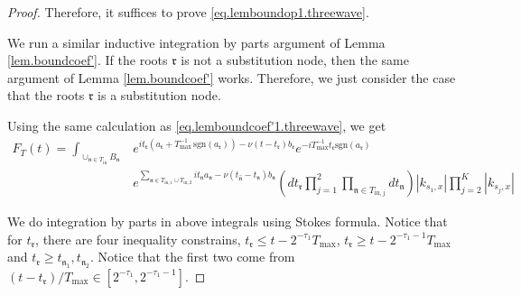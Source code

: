 \begin{proof}
Therefore, it suffices to prove \eqref{eq.lemboundop1.threewave}.

We run a similar inductive integration by parts argument of Lemma \ref{lem.boundcoef'}. If the roots $\mathfrak{r}$ is not a substitution node, then the same argument of Lemma \ref{lem.boundcoef'} works. Therefore, we just consider the case that the roots $\mathfrak{r}$ is a substitution node. 

Using the same calculation as \eqref{eq.lemboundcoef'1.threewave}, we get 
\begin{equation}
\begin{split}
    F_{T}(t)=\int_{\cup_{\mathfrak{n}\in T_{\text{in}}} B_{\mathfrak{n}}}&e^{it_{\mathfrak{r}}(a_{\mathfrak{r}}+T^{-1}_{\text{max}}\, \text{sgn}(a_{\mathfrak{r}}))- \nu(t-t_{\mathfrak{r}})b_{\mathfrak{r}}} e^{-iT^{-1}_{\text{max}}t_{\mathfrak{r}} \text{sgn}(a_{\mathfrak{r}})} 
    \\
    &e^{\sum_{\mathfrak{n}\in T_{\text{in},1}\cup T_{\text{in},2}} it_{\mathfrak{n}} a_{\mathfrak{n}} - \nu(t_{\widehat{\mathfrak{n}}}-t_{\mathfrak{n}})b_{\mathfrak{n}}}  \left(dt_{\mathfrak{r}}\prod_{j=1}^2\prod_{\mathfrak{n}\in T_{\text{in},j}}dt_{\mathfrak{n}}  \right)|k_{s_1,x}|\prod^K_{j=2}|k_{s_j,x}|
\end{split}
\end{equation}



We do integration by parts in above integrals using Stokes formula. Notice that for $t_{\mathfrak{r}}$, there are four inequality constrains, $t_{\mathfrak{r}}\le t-2^{-\tau_{1}}T_{\text{max}}$, $t_{\mathfrak{r}}\ge t-2^{-\tau_{1}-1}T_{\text{max}}$ and $t_{\mathfrak{r}}\ge t_{\mathfrak{n}_1},t_{\mathfrak{n}_2}$. Notice that the first two come from $(t-t_{\mathfrak{r}})/T_{\text{max}}\in [2^{-\tau_{1}},2^{-\tau_{1}-1}]$.



\end{proof}
